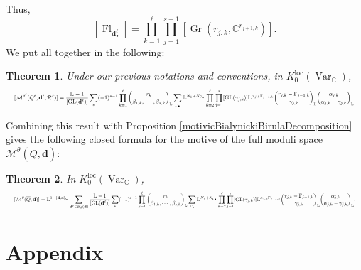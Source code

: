\documentclass{amsart}
\theoremstyle{plain}
\newtheorem{theorem}{Theorem}[section]
\numberwithin{equation}{section}
\theoremstyle{definition}
\theoremstyle{remark}
\begin{document}
	Thus, 
	$$
	[\operatorname{Fl}_{\mathbf{d}_\bullet^\ell}]=\prod_{k=1}^\ell\prod_{j=1}^{s-1}[\operatorname{Gr}(r_{j,k},\mathbb{C}^{r_{j+1,k}})].
	$$
	We put all together in the following:
	\begin{theorem}\label{motivicClassQuiverModuliWithRelations}
	Under our previous notations and conventions, in $K_0^{\text{loc}}(\operatorname{Var}_{\mathbb{C}})$,
	$$
			\resizebox{\textwidth}{!}{$ \displaystyle
		[\mathcal{M}^{\theta^\ell}(Q^\ell,\mathbf{d}^\ell,\mathcal{R}^\ell)]=\frac{\mathbb{L}-1}{[\operatorname{GL}(\mathbf{d}^\ell)]}\sum_{*}(-1)^{s-1}\prod_{k=1}^\ell{r_{k}\choose \beta_{1,k},\cdots ,\beta_{s,k}}_{\mathbb{L}}\sum_{\Gamma_\bullet} \mathbb{L}^{N_1+N_{\Gamma_\bullet}}\prod_{k=2}^\ell\prod_{j=1}^{s} [\operatorname{GL}(\gamma_{j,k})]\mathbb{L}^{\alpha_{j,k}\Gamma_{j-1,k}}{r_{j,k}-\Gamma_{j-1,k}\choose \gamma_{j,k}}_{\mathbb{L}}{\alpha_{j,k}\choose \alpha_{j,k}-\gamma_{j,k}}_{\mathbb{L}}.$}$$
	\end{theorem}
	
	Combining this result with Proposition \ref{motivicBialynickiBirulaDecomposition} gives the following closed formula for the motive of the full moduli space $\mathcal{M}^{\theta}(\overline{Q},\mathbf{d})$:
	\begin{theorem}\label{motivicClassOfNakajimaQuiverVariety}
	In $K_0^{\operatorname{loc}}(\operatorname{Var}_\mathbb{C})$,
	$$
		\resizebox{\textwidth}{!}{$ \displaystyle
		[\mathcal{M}^{\theta}(\overline{Q},\mathbf{d})]=\mathbb{L}^{1-\langle\mathbf{d},\mathbf{d}\rangle_Q}\sum_{\mathbf{d}^\ell\in \mathscr{D}_\theta(\mathbf{d})}\frac{\mathbb{L}-1}{[\operatorname{GL}(\mathbf{d}^\ell)]}\sum_{*}(-1)^{s-1}\prod_{k=1}^\ell{r_{k}\choose \beta_{1,k},\cdots ,\beta_{s,k}}_{\mathbb{L}}\sum_{\Gamma_\bullet} \mathbb{L}^{N_1+N_{\Gamma_\bullet}}\prod_{k=2}^\ell\prod_{j=1}^{s} [\operatorname{GL}(\gamma_{j,k})]\mathbb{L}^{\alpha_{j,k}\Gamma_{j-1,k}}{r_{j,k}-\Gamma_{j-1,k}\choose \gamma_{j,k}}_{\mathbb{L}}{\alpha_{j,k}\choose \alpha_{j,k}-\gamma_{j,k}}_{\mathbb{L}}.$}$$
	\end{theorem}
	
	\section{Appendix}\label{theAppendix}
\end{document}
